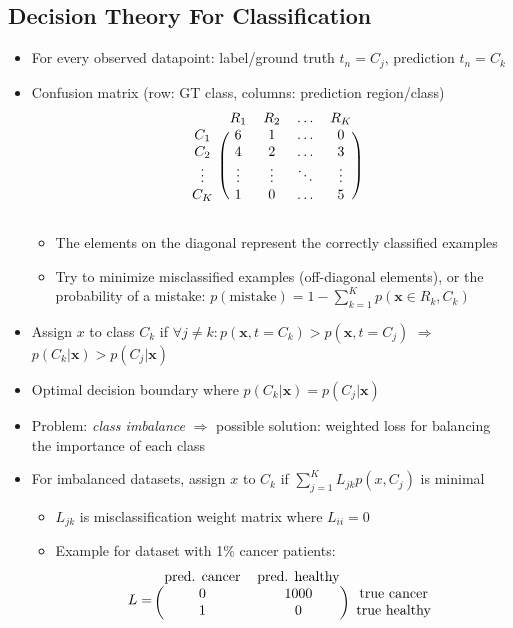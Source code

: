 \subsection{Decision Theory For Classification}
\begin{itemize}
	\item For every observed datapoint: label/ground truth $t_n=C_j$, prediction $t_n=C_k$
	\item Confusion matrix (row: GT class, columns: prediction region/class)
	$$\begin{blockarray}{ccccc}
	& R_1 & R_2 & \dots & R_K \\
	\begin{block}{c(cccc)}
	C_1 & 6 & 1 & \dots & 0 \\
	C_2 & 4 & 2 & \dots & 3 \\
	\vdots & \vdots & \vdots & \ddots & \vdots \\
	C_K & 1 & 0 & \dots & 5 \\
	\end{block}
	\end{blockarray}$$
	\begin{itemize}
		\item The elements on the diagonal represent the correctly classified examples
		\item Try to minimize misclassified examples (off-diagonal elements), or the probability of a mistake: $p\left(\text{mistake}\right) = 1 - \sum\limits_{k=1}^{K}p(\bm{x}\in R_k, C_k)$
	\end{itemize}
	\item Assign $x$ to class $C_k$ if $\forall j\neq k: p\left(\bm{x}, t=C_k\right) > p\left(\bm{x}, t=C_j\right)$ $\Rightarrow$ $p\left(C_k|\bm{x}\right) > p\left(C_j|\bm{x}\right)$
	\item Optimal decision boundary where $p\left(C_k|\bm{x}\right) = p\left(C_j|\bm{x}\right)$
	\item Problem: \textit{class imbalance} $\Rightarrow$ possible solution: weighted loss for balancing the importance of each class
	\item For imbalanced datasets, assign $x$ to $C_k$ if $\sum\limits_{j=1}^{K}L_{jk}p\left(x,C_j\right)$ is minimal 
	\begin{itemize}
		\item $L_{jk}$ is misclassification weight matrix where $L_{ii}=0$
		\item Example for dataset with 1\% cancer patients: 
		$$L = \begin{blockarray}{ccc}
		\text{pred. cancer} & \text{pred. healthy} & \\
		\begin{block}{(cc)c}
		0 & 1000 & \text{true cancer} \\
		1 & 0 & \text{true healthy} \\
		\end{block}
		\end{blockarray}$$
	\end{itemize}
\end{itemize}

